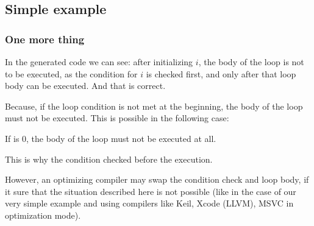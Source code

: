 \subsection{Simple example}





\subsubsection{One more thing}

In the generated code we can see: 
after initializing $i$, the body of the loop is not to be executed,
as the condition for $i$ is checked first, and only after that loop body can be executed.
And that is correct. 

Because, if the loop condition is
not met at the beginning, the body of the loop must not be executed.
This is possible in the following case:



If  is 0, the body of the loop must not be executed at all.

This is why the condition checked before the execution.

However, an optimizing compiler may swap the condition check and loop body,
if it sure that the situation described here is
not possible (like in the case of our very simple example and using compilers like Keil, Xcode (LLVM), MSVC in optimization mode).
